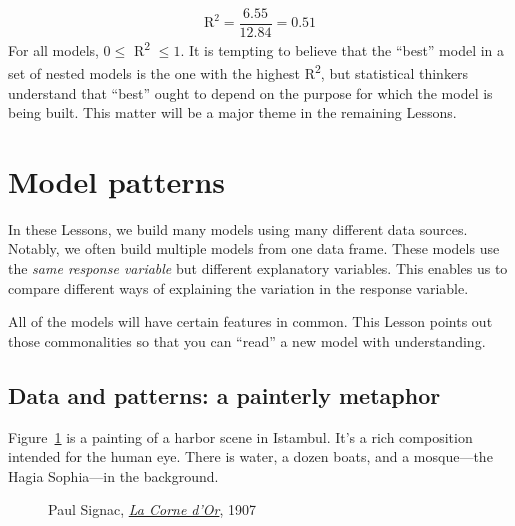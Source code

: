 \documentclass[
  letterpaper,
  DIV=11,
  numbers=noendperiod,
  oneside]{scrartcl}
\begin{document}
\[\text{R}^2 = \frac{6.55}{12.84} = 0.51\] For all models, \(0 \leq\)
R\textsuperscript{2} \(\leq 1\).
{} It is tempting to believe that
the ``best'' model in a set of nested models is the one with the highest
R\textsuperscript{2}, but statistical thinkers understand that ``best''
ought to depend on the purpose for which the model is being built. This
matter will be a major theme in the remaining Lessons.

\newpage

\section{Model patterns}\label{sec-model-patterns}

In these Lessons, we build many models using many different data
sources. Notably, we often build multiple models from one data frame.
These models use the \emph{same response variable} but different
explanatory variables. This enables us to compare different ways of
explaining the variation in the response variable.

All of the models will have certain features in common. This Lesson
points out those commonalities so that you can ``read'' a new model with
understanding.

\subsection{Data and patterns: a painterly
metaphor}\label{data-and-patterns-a-painterly-metaphor}

Figure~\ref{fig-signac-full} is a painting of a harbor scene in
Istambul. It's a rich composition intended for the human eye. There is
water, a dozen boats, and a mosque---the Hagia Sophia---in the
background.

\begin{figure}


\caption{\label{fig-signac-full}Paul Signac,
\href{https://en.m.wikipedia.org/wiki/File:Signac_Paul_-_La_Corne_d\%27Or.jpg}{\emph{La
Corne d'Or}}, 1907}

\end{figure}%
\end{document}
